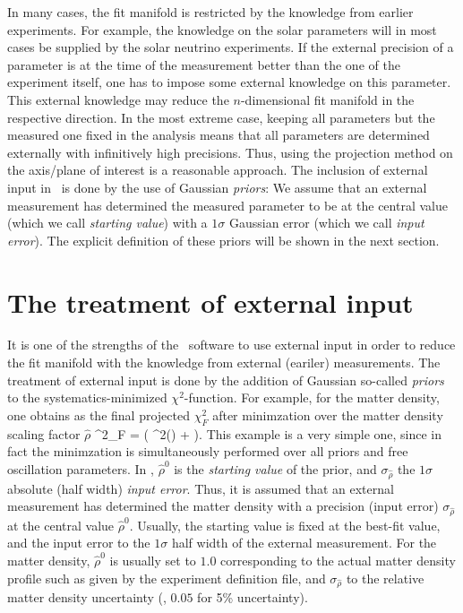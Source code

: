   
In many cases, the fit manifold is restricted by the knowledge from earlier experiments. For example, the knowledge on the solar parameters will in most cases be supplied by the solar neutrino experiments. If the external precision of a parameter is at the time of the measurement better than the one of the experiment itself, one has to impose some external knowledge on this parameter. This external knowledge may reduce the $n$-dimensional fit manifold in the respective direction. In the most extreme case, keeping all parameters but the measured one fixed in the analysis means that all parameters are determined externally with infinitively high precisions. Thus, using the projection method on the axis/plane of interest is a reasonable approach. The inclusion of external input in \GLOBES\ is done by the use of Gaussian {\em priors}: We assume that an external measurement has determined the measured parameter to be at the central value (which we call {\em starting value}) with a $1 \sigma$ Gaussian error (which we call {\em input error}). The explicit definition of these priors will be shown in the next section. 

\section{The treatment of external input}
\label{sec:externalinput}

It is one of the strengths of the \GLOBES\ software to use external input in order to reduce the fit manifold with the knowledge from external
(eariler) measurements. The treatment of external input is done by the addition of Gaussian so-called {\em priors} to the systematics-minimized $\chi^2$-function. For example, for the matter density, one obtains as the final projected $\chi^2_F$ after minimzation over the matter density
scaling factor  $\hat{\rho}$
\be
 \chi^2_F =  \left( \chi^2(\hat{\rho}) +  \right).
\label{equ:priors}
\ee
This example is a very simple one, since in fact the
minimzation is simultaneously performed over all priors and free oscillation parameters. In , $\hat{\rho}^0$ is the {\em starting value} of the prior, and $\sigma_{\hat{\rho}}$ the $1 \sigma$ absolute (half width) {\em input error}. Thus, it is assumed that an external measurement has determined the matter density with a precision (input error) $\sigma_{\hat{\rho}}$ at the central value $\hat{\rho}^0$. Usually, the starting value is fixed at the best-fit value, and the input error to the $1 \sigma$ half width of the external measurement. For the matter density, $\hat{\rho}^0$  is usually set to $1.0$ corresponding to
the actual matter density profile such as given by the experiment
 definition file, and $\sigma_{\hat{\rho}}$ to the 
relative matter density uncertainty (\eg, $0.05$ for 5\% uncertainty).

